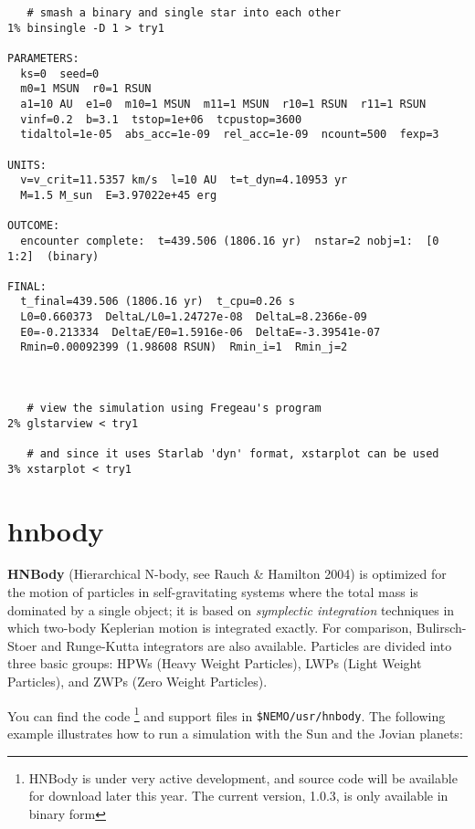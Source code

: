 \footnotesize\begin{verbatim}
   # smash a binary and single star into each other
1% binsingle -D 1 > try1

PARAMETERS:
  ks=0  seed=0
  m0=1 MSUN  r0=1 RSUN
  a1=10 AU  e1=0  m10=1 MSUN  m11=1 MSUN  r10=1 RSUN  r11=1 RSUN
  vinf=0.2  b=3.1  tstop=1e+06  tcpustop=3600
  tidaltol=1e-05  abs_acc=1e-09  rel_acc=1e-09  ncount=500  fexp=3
 
UNITS:
  v=v_crit=11.5357 km/s  l=10 AU  t=t_dyn=4.10953 yr
  M=1.5 M_sun  E=3.97022e+45 erg
 
OUTCOME:
  encounter complete:  t=439.506 (1806.16 yr)  nstar=2 nobj=1:  [0 1:2]  (binary)
 
FINAL:
  t_final=439.506 (1806.16 yr)  t_cpu=0.26 s
  L0=0.660373  DeltaL/L0=1.24727e-08  DeltaL=8.2366e-09
  E0=-0.213334  DeltaE/E0=1.5916e-06  DeltaE=-3.39541e-07
  Rmin=0.00092399 (1.98608 RSUN)  Rmin_i=1  Rmin_j=2



   # view the simulation using Fregeau's program
2% glstarview < try1

   # and since it uses Starlab 'dyn' format, xstarplot can be used
3% xstarplot < try1

\end{verbatim}\normalsize


\section{hnbody}

{\bf HNBody} (Hierarchical N-body, see Rauch \& Hamilton 2004)
is optimized for 
the motion of particles in self-gravitating systems where the total mass
is dominated by a single object; it is based on 
{\it symplectic integration} techniques 
in which two-body Keplerian motion is integrated exactly. 
For comparison, 
Bulirsch-Stoer and Runge-Kutta integrators are also available.
Particles are divided into three basic groups:
HPWs (Heavy Weight Particles), LWPs (Light Weight Particles), and
ZWPs (Zero Weight Particles).

You can find the code
\footnote{HNBody is under very active development, and source code will be 
available for download later this year. The current version, 1.0.3, is only
available in binary form}
and support files in {\tt \$NEMO/usr/hnbody}. The following example illustrates
how to run a simulation with the Sun and the Jovian planets:


